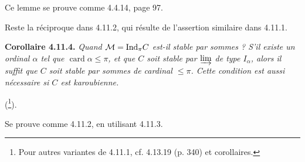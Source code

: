 Ce lemme se prouve comme 4.4.14, page 97.

Reste la réciproque dans 4.11.2, qui résulte de l'assertion similaire dans 4.11.1.

\textbf{Corollaire 4.11.4.} \textit{Quand $\mathcal{M} = \mathrm{Ind}_\pi C$ est-il stable par sommes ? S'il existe un ordinal $\alpha$ tel que $\operatorname{card}\alpha \leqslant \pi$, et que $C$ soit stable par $\varinjlim$ de type $I_\alpha$, alors il suffit que $C$ soit stable par sommes de cardinal $\leqslant \pi$. Cette condition est aussi nécessaire si $C$ est karoubienne.}

(\footnote{Pour autres variantes de 4.11.1, cf. 4.13.19 (p. 340) et corollaires.}).

Se prouve comme 4.11.2, en utilisant 4.11.3.


